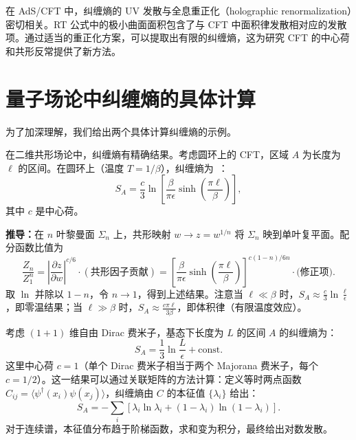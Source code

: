 \begin{remark}[纠缠熵与全息重正化]
在 AdS/CFT 中，纠缠熵的 UV 发散与全息重正化（holographic renormalization）密切相关。RT 公式中的极小曲面面积包含了与 CFT 中面积律发散相对应的发散项。通过适当的重正化方案，可以提取出有限的纠缠熵，这为研究 CFT 的中心荷和共形反常提供了新方法。
\end{remark}

\section{量子场论中纠缠熵的具体计算}

为了加深理解，我们给出两个具体计算纠缠熵的示例。

\begin{example}\label{ex:2d_CFT}
在二维共形场论中，纠缠熵有精确结果。考虑圆环上的 CFT，区域 $A$ 为长度为 $\ell$ 的区间。在圆环上（温度 $T = 1/\beta$），纠缠熵为~\cite{Calabrese2004}：
\begin{equation}
    S_A = \frac{c}{3} \ln\left[\frac{\beta}{\pi\epsilon}\sinh\left(\frac{\pi\ell}{\beta}\right)\right],
\end{equation}
其中 $c$ 是中心荷。

\textbf{推导：}在 $n$ 叶黎曼面 $\Sigma_n$ 上，共形映射 $w \to z = w^{1/n}$ 将 $\Sigma_n$ 映到单叶复平面。配分函数比值为
\begin{equation}
    \frac{Z_n}{Z_1^n} = \left|\frac{\partial z}{\partial w}\right|^{c/6} \cdot (\text{共形因子贡献}) = \left[\frac{\beta}{\pi\epsilon}\sinh\left(\frac{\pi\ell}{\beta}\right)\right]^{c(1-n)/6n} \cdot \text{(修正项)}.
\end{equation}
取 $\ln$ 并除以 $1-n$，令 $n \to 1$，得到上述结果。注意当 $\ell \ll \beta$ 时，$S_A \approx \frac{c}{3}\ln\frac{\ell}{\epsilon}$，即零温结果；当 $\ell \gg \beta$ 时，$S_A \approx \frac{c\pi\ell}{3\beta}$，即体积律（有限温度效应）。
\end{example}

\begin{example}[自由费米子的纠缠熵]
考虑 $(1+1)$ 维自由 Dirac 费米子，基态下长度为 $L$ 的区间 $A$ 的纠缠熵为：
\begin{equation}
    S_A = \frac{1}{3}\ln\frac{L}{\epsilon} + \text{const}.
\end{equation}
这里中心荷 $c = 1$（单个 Dirac 费米子相当于两个 Majorana 费米子，每个 $c = 1/2$）。这一结果可以通过关联矩阵的方法计算：定义等时两点函数 $C_{ij} = \langle\psi^\dagger(x_i)\psi(x_j)\rangle$，纠缠熵由 $C$ 的本征值 $\{\lambda_i\}$ 给出：
\begin{equation}
    S_A = -\sum_i \left[\lambda_i \ln \lambda_i + (1-\lambda_i)\ln(1-\lambda_i)\right].
\end{equation}
对于连续谱，本征值分布趋于阶梯函数，求和变为积分，最终给出对数发散。
\end{example}

